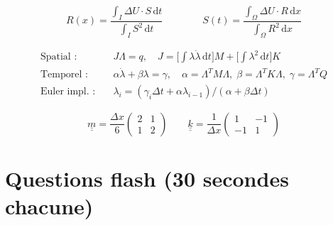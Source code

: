 \documentclass[11pt,a4paper]{article}
\begin{document}
\begin{membox}
\[
R(x) = \frac{\int_I\Delta U\cdot S\,\mathrm{d}t}{\int_I S^2\,\mathrm{d}t} \qquad\qquad S(t) = \frac{\int_\Omega\Delta U\cdot R\,\mathrm{d}x}{\int_\Omega R^2\,\mathrm{d}x}
\]
\end{membox}

\begin{membox}
\begin{align*}
\text{Spatial~:} & \quad J\Lambda = q, \quad J = \Big[\textstyle\int\lambda\dot{\lambda}\,\mathrm{d}t\Big]M + \Big[\textstyle\int\lambda^2\,\mathrm{d}t\Big]K \\
\text{Temporel~:} & \quad \alpha\dot{\lambda}+\beta\lambda=\gamma, \quad \alpha=\Lambda^TM\Lambda,\; \beta=\Lambda^TK\Lambda,\; \gamma=\Lambda^TQ \\
\text{Euler impl.~:} & \quad \lambda_i = (\gamma_i\Delta t + \alpha\lambda_{i-1})/(\alpha+\beta\Delta t)
\end{align*}
\end{membox}

\begin{membox}
\[
\underline{\underline{m}} = \frac{\Delta x}{6}\begin{pmatrix}2&1\\1&2\end{pmatrix} \qquad \underline{\underline{k}} = \frac{1}{\Delta x}\begin{pmatrix}1&-1\\-1&1\end{pmatrix}
\]
\end{membox}

\section{Questions flash (30 secondes chacune)}
\end{document}
